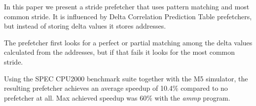 In this paper we present a stride prefetcher that uses pattern matching and
most common stride. It is influenced by Delta Correlation Prediction Table
prefetchers, but instead of storing delta values it stores addresses.

The prefetcher first looks for a perfect or partial matching among the delta
values calculated from the addresses, but if that fails it looks for the most
common stride.

Using the SPEC CPU2000 benchmark suite together with the M5 simulator, the
resulting prefetcher achieves an average speedup of 10.4\% compared to no
prefetcher at all. Max achieved speedup was 60\% with the \emph{ammp} program.
